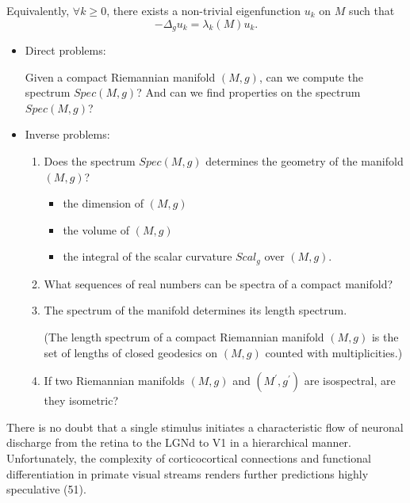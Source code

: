 Equivalently, $\forall k \geq 0$, there exists a non-trivial eigenfunction $u_k$ on $M$  such that 
$$-\Delta_g u_k = \lambda_k(M) u_k.$$

\begin{itemize}
    \item Direct problems: 
    
    Given a compact Riemannian manifold $(M,g)$, can we compute the spectrum $Spec(M,g)$? And can we find properties on the spectrum $Spec(M,g)$?
    \item Inverse problems: 
    \begin{enumerate}
        \item Does the spectrum $Spec(M,g)$ determines the geometry of the manifold $(M,g)$? 
        \begin{itemize}
            \item the dimension of $(M,g)$
            \item the volume of $(M,g)$
            \item the integral of the scalar curvature $Scal_g$ over $(M,g)$.
        \end{itemize}
        
        \item What sequences of real numbers can be spectra of a compact manifold?
        
        \item The spectrum of the manifold determines its length spectrum. 
        
        (The length spectrum of a compact Riemannian manifold $(M,g)$ is the set of lengths of closed geodesics on $(M,g)$ counted with multiplicities.)
        
        \item If two Riemannian manifolds $(M,g)$ and $(M^\prime,g^\prime)$ are isospectral, are they isometric?
    \end{enumerate}
    \end{itemize}
    
    
There is no doubt that a single stimulus initiates a characteristic flow of neuronal discharge from the retina to the LGNd to V1 in a hierarchical manner. Unfortunately, the complexity of corticocortical connections and functional differentiation in primate visual streams renders further predictions highly speculative (51).